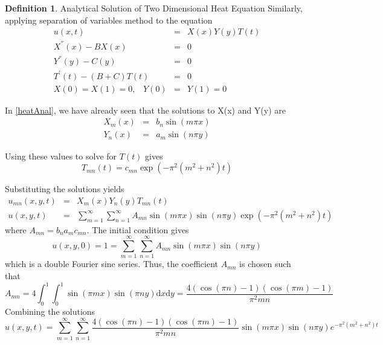 \documentclass[12pt, oneside]{book}
\theoremstyle{plain}
\theoremstyle{definition}
\newtheorem{definition}[theorem]{Definition}
\begin{document}
\begin{definition}\label{heat2Anal} Analytical Solution of Two Dimensional Heat Equation
Similarly, applying separation of variables method to the equation
\begin{eqnarray}
u(x,t) &=& X(x) Y(y) T(t) \\[10pt]
X^{''}(x) - B X(x) &=& 0 \\[10pt]
Y^{''}(y) - C (y) &=& 0 \\[10pt]
T^{'}(t) - (B + C) T(t) &=& 0 \\[10pt]
X(0) = X(1) = 0, \hspace{10pt} Y(0) &=& Y(1) = 0
\end{eqnarray}

In \ref{heatAnal}, we have already seen that the solutions to X(x) and Y(y) are
\begin{eqnarray} 
X_m (x) &=& b_n \sin(m \pi x) \\
Y_n (x) &=& a_m \sin(n \pi y)
\end{eqnarray}

Using these values to solve for $T(t)$ gives
\begin{equation}
T_{mn}(t) = c_{mn} \exp(- \pi^2 (m^2 + n^2)t)
\end{equation}

Substituting the solutions yields
\begin{eqnarray}
u_{mn}(x, y, t) &=& X_m(x) Y_n(y) T_{mn}(t)\\
u(x, y, t) &=& \sum_{m=1}^{\infty} \sum_{n=1}^{\infty} A_{mn} \sin(m \pi x) \sin(n \pi y) \exp(- \pi^2 (m^2 + n^2)t)
\end{eqnarray}
where $A_{mn} = b_n a_m c_{mn}$.
The initial condition gives
\begin{equation}
u(x, y, 0) = 1 = \sum_{m=1}^{\infty} \sum_{n=1}^{\infty}  A_{mn} \sin(m \pi x) \sin(n \pi y)
\end{equation}
which is a double Fourier sine series. Thus, the coefficient $A_{mn}$ is chosen such that
\begin{equation}
 A_{mn} = 4 \int_{0}^{1}  \int_{0}^{1} \sin(\pi m x) \sin(\pi n y) \mathrm{d}x \mathrm{d}y = \frac{4(\cos(\pi n) - 1)(\cos(\pi m) - 1)}{\pi^2 m n} 
\end{equation}
Combining the solutions
\begin{equation}
u(x, y, t) = \sum_{m=1}^{\infty} \sum_{n=1}^{\infty} \frac{4(\cos(\pi n) - 1)(\cos(\pi m) - 1)}{\pi^2 m n}  \sin(m \pi x) \sin(n \pi y) e^{- \pi^2 (m^2 + n^2)t}
\end{equation}
\end{definition}
\end{document}
